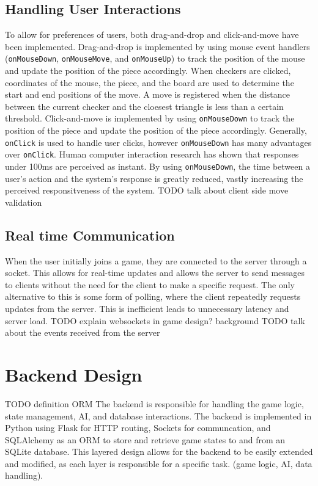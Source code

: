 \subsection{Handling User Interactions}
To allow for preferences of users, both drag-and-drop and click-and-move have been implemented. 
Drag-and-drop is implemented by using mouse event handlers (\verb|onMouseDown|, \verb|onMouseMove|, and \verb|onMouseUp|) to track the position of the mouse and update the position of the piece accordingly. When checkers are clicked, coordinates of the mouse, the piece, and the board are used to determine the start and end positions of the move. A move is registered when the distance between the current checker and the cloesest triangle is less than a certain threshold. 
Click-and-move is implemented by using \verb|onMouseDown| to track the position of the piece and update the position of the piece accordingly. Generally, \verb|onClick| is used to handle user clicks, however \verb|onMouseDown| has many advantages over \verb|onClick|. Human computer interaction research \cite{mousedown} \cite{mousedown2} has shown that responses under 100ms are perceived as instant. By using \verb|onMouseDown|, the time between a user's action and the system's response is greatly reduced, vastly increasing the perceived responsitveness of the system.
TODO talk about client side move validation

\subsection{Real time Communication}
When the user initially joins a game, they are connected to the server through a socket. This allows for real-time updates and allows the server to send messages to clients without the need for the client to make a specific request. The only alternative to this is some form of polling, where the client repeatedly requests updates from the server. This is inefficient leads to unnecessary latency and server load. TODO explain websockets in game design? background
TODO talk about the events received from the server


\section{Backend Design}
TODO definition ORM
The backend is responsible for handling the game logic, state management, AI, and database interactions. The backend is implemented in Python using Flask for HTTP routing, Sockets for communcation, and SQLAlchemy as an ORM to store and retrieve game states to and from an SQLite database. This layered design allows for the backend to be easily extended and modified, as each layer is responsible for a specific task. (game logic, AI, data handling).

